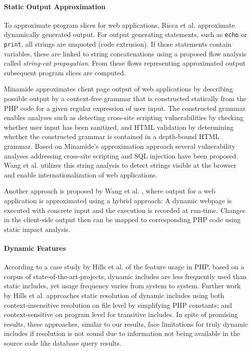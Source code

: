 \documentclass[sigconf]{acmart}
\renewcommand{\tt}[1]{\texttt{#1}}
\begin{document}
\paragraph{Static Output Approximation}
To approximate program slices for web
applications, Ricca et al. \cite{tonella_web_2005,tonella_2001,tonella_2002} approximate
dynamically generated output. For output generating statements, such as \tt{echo} or
\tt{print}, all strings are unquoted (code extrusion). If those statements
contain variables, these are linked to string concatenations using a
proposed flow analysis called \emph{string-cat propagation}. From these
flows representing approximated output subsequent program slices are computed.

Minamide \cite{minamide_static_2005} approximates client page output
of web applications by describing possible output by a context-free
grammar that is constructed statically from the PHP code for a given regular
expression of user input. The constructed grammar enables analyses such as
detecting cross-site scripting vulnerabilities by checking whether user input
has been sanitized, and HTML validation by determining whether the constructed
grammar is contained in a depth-bound HTML grammar. Based on Minamide's
approximation approach several vulnerability analyses addressing cross-site
scripting \cite{wassermann_static_2008} and SQL injection
\cite{wassermann2007sound} have been proposed. Wang et al.
\cite{wang_locating_2010} utilizes this string analysis to detect strings
visible at the browser and enable internationalization of web applications.
    
Another approach is proposed by Wang et al. \cite{wang_automating_2012}, where
output for a web application is approximated using a hybrid approach: A
dynamic webpage is executed with concrete input and the execution is
recorded at run-time. Changes in the client-side output then can be mapped to 
corresponding PHP code using static impact analysis.

\paragraph{Dynamic Features}
According to a case study by Hills et al. \cite{Hills:2013:ESP:2483760.2483786}
of the feature usage in PHP, based on a corpus of state-of-the-art-projects,
dynamic includes are less frequently used than static includes, yet usage
frequency varies from system to system. Further work by Hills et al.
\cite{hills2014static,hills2014php} approaches static resolution of dynamic includes using
both context-insensitive resolution on file level by simplifying PHP constants;
and context-sensitive on program level for transitive includes. In spite of 
promising results, these approaches, similar to our results, face limitations
for truly dynamic includes if resolution is not sound due to information not
being available in the source code like database query results.
\end{document}
